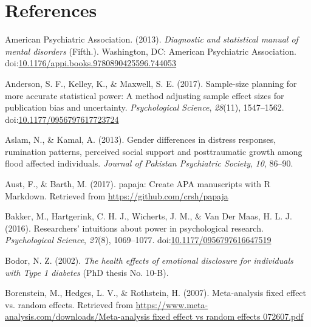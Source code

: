 \documentclass[man]{apa6}
\theoremstyle{definition}
\theoremstyle{definition}
\theoremstyle{definition}
\theoremstyle{remark}
\begin{document}
\newpage

\section{References}\label{references}

\setlength{\parindent}{-0.5in} \setlength{\leftskip}{0.5in}

\hypertarget{refs}{}
\hypertarget{ref-AmericanPsychiatricAssociation2013}{}
American Psychiatric Association. (2013). \emph{Diagnostic and
statistical manual of mental disorders} (Fifth.). Washington, DC:
American Psychiatric Association.
doi:\href{https://doi.org/10.1176/appi.books.9780890425596.744053}{10.1176/appi.books.9780890425596.744053}

\hypertarget{ref-Anderson2017a}{}
Anderson, S. F., Kelley, K., \& Maxwell, S. E. (2017). Sample-size
planning for more accurate statistical power: A method adjusting sample
effect sizes for publication bias and uncertainty. \emph{Psychological
Science}, \emph{28}(11), 1547--1562.
doi:\href{https://doi.org/10.1177/0956797617723724}{10.1177/0956797617723724}

\hypertarget{ref-Aslam2013}{}
Aslam, N., \& Kamal, A. (2013). Gender differences in distress
responses, rumination patterns, perceived social support and
posttraumatic growth among flood affected individuals. \emph{Journal of
Pakistan Psychiatric Society}, \emph{10}, 86--90.

\hypertarget{ref-Aust2017}{}
Aust, F., \& Barth, M. (2017). papaja: Create APA manuscripts with R
Markdown. Retrieved from \url{https://github.com/crsh/papaja}

\hypertarget{ref-Bakker2016}{}
Bakker, M., Hartgerink, C. H. J., Wicherts, J. M., \& Van Der Maas, H.
L. J. (2016). Researchers' intuitions about power in psychological
research. \emph{Psychological Science}, \emph{27}(8), 1069--1077.
doi:\href{https://doi.org/10.1177/0956797616647519}{10.1177/0956797616647519}

\hypertarget{ref-Bodor2002}{}
Bodor, N. Z. (2002). \emph{The health effects of emotional disclosure
for individuals with Type 1 diabetes} (PhD thesis No. 10-B).

\hypertarget{ref-Borenstein2007}{}
Borenstein, M., Hedges, L. V., \& Rothstein, H. (2007). Meta-analysis
fixed effect vs. random effects. Retrieved from
\href{https://www.meta-analysis.com/downloads/Meta-analysis\%20fixed\%20effect\%20vs\%20random\%20effects\%20072607.pdf}{https://www.meta-analysis.com/downloads/Meta-analysis fixed effect vs random effects 072607.pdf}
\end{document}
